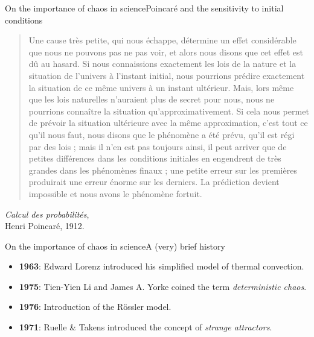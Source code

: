 \documentclass[usenames,dvipsnames,svgnames,10pt,aspectratio=169]{beamer}
\begin{document}
\begin{frame}[t, c]{On the importance of chaos in science}{Poincaré and the sensitivity to initial conditions}
	\begin{quote}
		Une cause très petite, qui nous échappe, détermine un effet considérable que nous ne pouvons pas ne pas voir, et alors nous disons que cet effet est dû au hasard. Si nous connaissions exactement les lois de la nature et la situation de l'univers à l'instant initial, nous pourrions prédire exactement la situation de ce même univers à un instant ultérieur. Mais, lors même que les lois naturelles n'auraient plus de secret pour nous, nous ne pourrions connaître la situation qu'approximativement. Si cela nous permet de prévoir la situation ultérieure avec la même approximation, c'est tout ce qu'il nous faut, nous disons que le phénomène a été prévu, qu'il est régi par des lois ; mais il n'en est pas toujours ainsi, il peut arriver que de petites différences dans les conditions initiales en engendrent de très grandes dans les phénomènes finaux ; une petite erreur sur les premières produirait une erreur énorme sur les derniers. La prédiction devient impossible et nous avons le phénomène fortuit.
	\end{quote}

	\begin{flushright}
		\emph{Calcul des probabilités},\\ Henri Poincaré, 1912.
	\end{flushright}

	\vspace{1cm}
\end{frame}

\begin{frame}[t, c]{On the importance of chaos in science}{A (very) brief history}
	\begin{itemize}
		\item \alert{\textbf{1963}}: Edward Lorenz introduced his simplified model of thermal convection.

		\bigskip

		\item \alert{\textbf{1975}}: Tien-Yien Li and James A. Yorke coined the term \emph{deterministic chaos}.

		\bigskip

		\item \alert{\textbf{1976}}: Introduction of the R\"ossler model.

		\bigskip

		\item \alert{\textbf{1971}}: Ruelle \& Takens introduced the concept of \emph{strange attractors}.
	\end{itemize}

	\vspace{1cm}
\end{frame}
\end{document}
